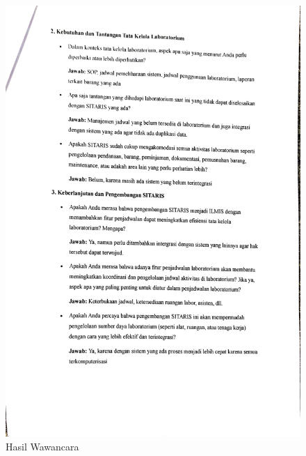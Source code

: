 \begin{figure}[h]
	\centering
	\includegraphics[width=0.82\linewidth]{konten/gambar/wawancara/wawancara_2.jpg}
	\caption{Hasil Wawancara}
	\label{fig:hasil-wawancara}
\end{figure}
